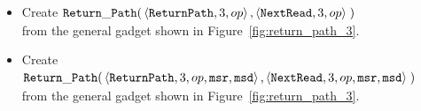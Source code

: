 \begin{itemize}
    \item Create
    $\begin{aligned}[t]
        {\tt Return\_Path}(& \left\langle {\tt ReturnPath},  3, op \right\rangle,
                      \left\langle {\tt NextRead},    3, op \right\rangle \;)
    \end{aligned}$\\from the general gadget shown in Figure~\ref{fig:return_path_3}.


    \item Create
    $\begin{aligned}[t]
        {\tt Return\_Path}(& \left\langle {\tt ReturnPath}, 3, op, {\tt msr}, {\tt msd} \right\rangle,
                      \left\langle {\tt NextRead},   3, op, {\tt msr}, {\tt msd} \right\rangle \;)
    \end{aligned}$\\from the general gadget shown in Figure~\ref{fig:return_path_3}.

\end{itemize}

